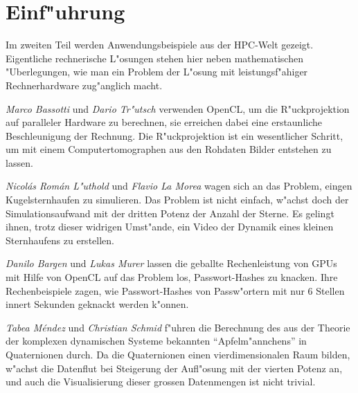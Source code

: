 \chapter*{Einf"uhrung}
Im zweiten Teil werden Anwendungsbeispiele aus der HPC-Welt gezeigt.
Eigentliche rechnerische L"osungen stehen hier neben mathematischen
"Uberlegungen, wie man ein Problem der L"osung mit leistungsf"ahiger
Rechnerhardware zug"anglich macht.

{\em Marco Bassotti} und {\em Dario Tr"utsch} verwenden OpenCL, um die R"uckprojektion
auf paralleler Hardware zu berechnen, sie erreichen dabei eine erstaunliche
Beschleunigung der Rechnung.
Die R"uckprojektion ist ein wesentlicher Schritt, um mit einem
Computertomographen aus den Rohdaten Bilder entstehen zu lassen.

{\em Nicol\'as Rom\'an L"uthold} und {\em Flavio La Morea}
wagen sich an das Problem,
eingen Kugelsternhaufen zu simulieren. Das Problem ist nicht einfach,
w"achst doch der Simulationsaufwand mit der dritten Potenz der Anzahl
der Sterne.
Es gelingt ihnen, trotz dieser widrigen Umst"ande, ein Video der Dynamik
eines kleinen Sternhaufens zu erstellen.

{\em Danilo Bargen} und {\em Lukas Murer} lassen die geballte Rechenleistung von GPUs
mit Hilfe von OpenCL auf das Problem los, Passwort-Hashes zu knacken.
Ihre Rechenbeispiele zagen, wie Passwort-Hashes von Passw"ortern mit nur
6 Stellen innert Sekunden geknackt werden k"onnen.

{\em Tabea M\'endez} und {\em Christian Schmid} f"uhren die Berechnung des aus der
Theorie der komplexen dynamischen Systeme bekannten ``Apfelm"annchens''
in Quaternionen durch. Da die Quaternionen einen vierdimensionalen
Raum bilden, w"achst die Datenflut bei Steigerung der Aufl"osung mit
der vierten Potenz an, und auch die Visualisierung dieser grossen Datenmengen
ist nicht trivial.

